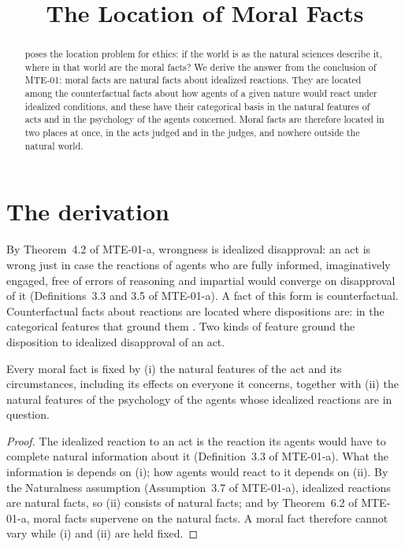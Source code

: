 \documentclass{situationist-preprint}
\title{The Location of Moral Facts}
\begin{document}
\maketitle

\begin{abstract}
\citet{Jackson1998} poses the location problem for ethics: if the world is as the natural sciences describe it, where in that world are the moral facts? We derive the answer from the conclusion of MTE-01: moral facts are natural facts about idealized reactions. They are located among the counterfactual facts about how agents of a given nature would react under idealized conditions, and these have their categorical basis in the natural features of acts and in the psychology of the agents concerned. Moral facts are therefore located in two places at once, in the acts judged and in the judges, and nowhere outside the natural world.
\end{abstract}

\section{The derivation}\label{s:der}

By Theorem~4.2 of MTE-01-a, wrongness is idealized disapproval: an act is wrong just in case the reactions of agents who are fully informed, imaginatively engaged, free of errors of reasoning and impartial would converge on disapproval of it (Definitions~3.3 and 3.5 of MTE-01-a). A fact of this form is counterfactual. Counterfactual facts about reactions are located where dispositions are: in the categorical features that ground them \citep{Lewis1989}. Two kinds of feature ground the disposition to idealized disapproval of an act.

\begin{proposition}[Location]\label{p:loc}
Every moral fact is fixed by (i) the natural features of the act and its circumstances, including its effects on everyone it concerns, together with (ii) the natural features of the psychology of the agents whose idealized reactions are in question.
\end{proposition}

\begin{proof}
The idealized reaction to an act is the reaction its agents would have to complete natural information about it (Definition~3.3 of MTE-01-a). What the information is depends on (i); how agents would react to it depends on (ii). By the Naturalness assumption (Assumption~3.7 of MTE-01-a), idealized reactions are natural facts, so (ii) consists of natural facts; and by Theorem~6.2 of MTE-01-a, moral facts supervene on the natural facts. A moral fact therefore cannot vary while (i) and (ii) are held fixed.
\end{proof}
\end{document}

